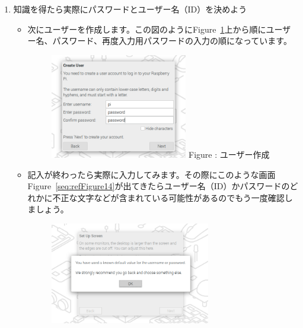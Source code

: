 \documentclass[a4paper,12pt]{jarticle}
\begin{document}
\begin{enumerate}
\clearpage

    \item             
                知識を得たら実際にパスワードとユーザー名（ID）を決めよう
                \begin{itemize}
                \item                                      
                次にユーザーを作成します。この図のようにFigure~\ref{seq:refFigure11}上から順にユーザー名、パスワード、再度入力用パスワードの入力の順になっています。
              
        
                    \begin{figure}[h]
                      \centering
                      \begin{minipage}{5.228cm}
                        {\upshape
                          \includegraphics[width=6.000cm]{sw_image03.png}
                          \newline
                          Figure {\theFigure\label{seq:refFigure11}}:
                          ユーザー作成}
                      \end{minipage}
                    \end{figure}
                  \end{itemize}
                  \begin{itemize}
                  \item
                      記入が終わったら実際に入力してみます。その際にこのような画面Figure~\ref{seq:refFigure14}が出てきたらユーザー名（ID）かパスワードのどれかに不正な文字などが含まれている可能性があるのでもう一度確認しましょう。
                      \begin{figure}[h]
                        \centering
                        \begin{minipage}{5.228cm}
                          {\upshape
                            \includegraphics[width=7.000cm]{sw_image04.png}
}
\end{minipage}
\end{figure}
\end{itemize}
\end{enumerate}
\end{document}
